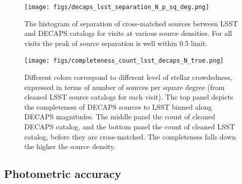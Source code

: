 \documentclass[DM,lsstdraft,toc,usenatbib]{lsstdoc}
\begin{document}




\begin{figure}
\texttt{[image: figs/decaps\_lsst\_separation\_N\_p\_sq\_deg.png]}
\caption{The histogram of separation of cross-matched sources between LSST and DECAPS catalogs for visits at various source densities. For all visits the peak of source separation is well within 0.5 \arcsec limit.  }
\label{fig:separation_histogram}
\end{figure} 


\begin{figure}
\begin{centering}
\texttt{[image: figs/completeness\_count\_lsst\_decaps\_N\_true.png]}
\caption{Different colors correspond to different level of stellar crowdedness, expressed in terms of number of sources per square degree (from cleaned LSST source catalogs for each visit). The top panel depicts the completeness of DECAPS sources to LSST binned along DECAPS magnitudes. The middle panel the count of cleaned DECAPS catalog, and the bottom panel the count of cleaned LSST catalog, before they are cross-matched.  The completeness  falls down the higher the  source density. }
\label{fig:completeness}
\end{centering}
\end{figure} 



\subsection{Photometric accuracy}
\end{document}

